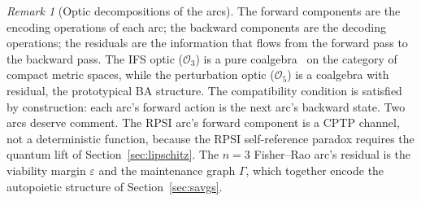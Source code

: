 \documentclass[11pt,a4paper]{article}
\theoremstyle{plain}
\theoremstyle{definition}
\theoremstyle{remark}
\newtheorem{remark}[theorem]{Remark}
\newcommand{\OO}{\mathcal{O}}
\begin{document}
\begin{remark}[Optic decompositions of the arcs]
\label{rem:optics-decomp}
The forward components are the encoding operations of each arc; the
backward components are the decoding operations; the residuals are the
information that flows from the forward pass to the backward pass. The
IFS optic ($\OO_3$) is a pure coalgebra~\cite{rutten2000} on the
category of compact metric spaces, while the perturbation optic
($\OO_5$) is a coalgebra with residual, the prototypical BA
structure. The compatibility condition is satisfied by construction:
each arc's forward action is the next arc's backward state. Two arcs
deserve comment. The RPSI arc's forward component is a CPTP channel,
not a deterministic function, because the RPSI self-reference paradox
requires the quantum lift of Section~\ref{sec:lipschitz}. The $n=3$
Fisher--Rao arc's residual is the viability margin $\varepsilon$ and
the maintenance graph $\Gamma$, which together encode the autopoietic
structure of Section~\ref{sec:savgs}.
\end{remark}
\end{document}
